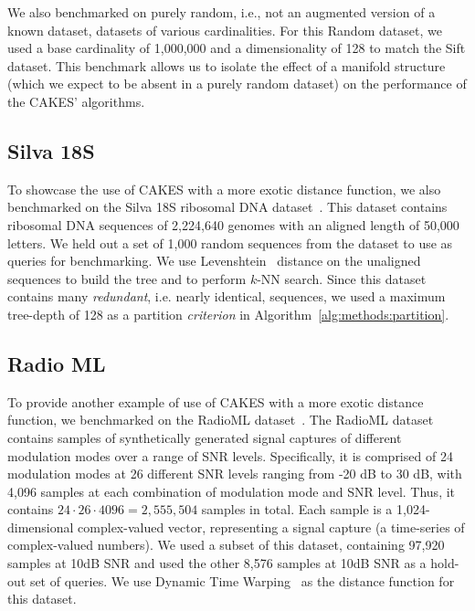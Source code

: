 We also benchmarked on purely random, i.e., not an augmented version of a known dataset, datasets of various cardinalities. 
For this Random dataset, we used a base cardinality of 1,000,000 and a dimensionality of 128 to match the Sift dataset.
This benchmark allows us to isolate the effect of a manifold structure (which we expect to be absent in a purely random dataset) on the performance of the CAKES' algorithms. 


\subsection{Silva 18S}
\label{sec:datasets-and-benchmarks:silva-18s}

To showcase the use of CAKES with a more exotic distance function, we also benchmarked on the Silva 18S ribosomal DNA dataset~\cite{10.1093/nar/gks1219}.
This dataset contains ribosomal DNA sequences of 2,224,640 genomes with an aligned length of 50,000 letters.
We held out a set of 1,000 random sequences from the dataset to use as queries for benchmarking.
We use Levenshtein~\cite{levenshtein1966binary} distance on the unaligned sequences to build the tree and to perform $k$-NN search.
Since this dataset contains many \emph{redundant}, i.e. nearly identical, sequences, we used a maximum tree-depth of 128 as a partition \emph{criterion} in Algorithm~\ref{alg:methods:partition}.


\subsection{Radio ML}
\label{sec:datasets-and-benchmarks:radio-ml}

To provide another example of use of CAKES with a more exotic distance function, we benchmarked on the RadioML dataset~\cite{oshea2018radioml}.
The RadioML dataset contains samples of synthetically generated signal captures of different modulation modes over a range of SNR levels.
Specifically, it is comprised of 24 modulation modes at 26 different SNR levels ranging from -20 dB to 30 dB, with 4,096 samples at each combination of modulation mode and SNR level.
Thus, it contains $24 \cdot 26 \cdot 4096 = 2,555,504$ samples in total.
Each sample is a 1,024-dimensional complex-valued vector, representing a signal capture (a time-series of complex-valued numbers).
We used a subset of this dataset, containing 97,920 samples at 10dB SNR and used the other 8,576 samples at 10dB SNR as a hold-out set of queries.
We use Dynamic Time Warping~\cite{muller2007dynamic} as the distance function for this dataset.


